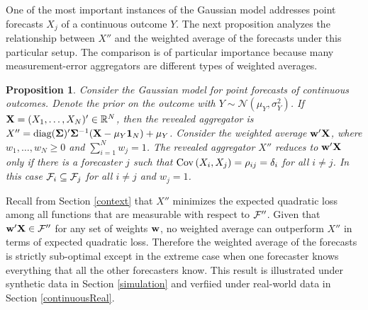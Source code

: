 \documentclass[11pt]{article}
\newcommand{\E}{\mathbb{E}}
\newtheorem{proposition}[theorem]{Proposition}
\theoremstyle{definition}
\theoremstyle{definition}
\def\one{{\bf 1}}
\def\bSigma{{\bf \Sigma}}
\def\w{{\bf w}}
\def\X{{\bf X}}
\def\F{{\cal F}}
\def\E{{\mathbb E}}
\def\Cov{{\rm Cov}\,}
\def\diag{\text{diag}}
\def\diag{\text{diag}}
\begin{document}

 One of the most important instances of the Gaussian model addresses point forecasts $X_j$ of a continuous outcome $Y$. The next proposition analyzes the relationship between $X''$ and the weighted average of the forecasts under this particular setup. The comparison is of particular importance because many measurement-error aggregators are different types of weighted averages.

\begin{proposition} \label{Gaussian}
Consider the Gaussian model for point forecasts of continuous outcomes. Denote the prior on the outcome with $Y \sim \mathcal{N}(\mu_Y, \sigma_Y^2)$. If $\X = (X_1, \dots, X_N)' \in \mathbb{R}^N$, then the revealed aggregator is $X'' = \diag(\bSigma)'\bSigma^{-1}(\X-\mu_Y\one_N) + \mu_Y$.  Consider the weighted average $\w'\X$, where $w_1, \dots, w_N \geq 0$ and $\sum_{i=1}^N w_j = 1$.
The revealed aggregator $X''$ reduces to $\w'\X$ only if there is a forecaster $j$ such that $\Cov(X_i, X_j) = \rho_{ij} =  \delta_i$  for all $i \neq j$. In this case $\F_i \subseteq \F_j$ for all $i \neq j$ and $w_j = 1$. 
\end{proposition}
Recall from Section \ref{context} that $X''$ minimizes the expected quadratic loss among all functions that are measurable with respect to $\F''$. Given that $\w' \X \in \F''$ for any set of weights $\w$, no weighted average can outperform $X''$ in terms of expected quadratic loss. Therefore the weighted average of the forecasts is strictly sub-optimal except in the extreme case when one forecaster knows everything that all the other forecasters know. This result is illustrated under synthetic data in Section \ref{simulation} and verfiied under real-world data in Section \ref{continuousReal}.
\end{document}
